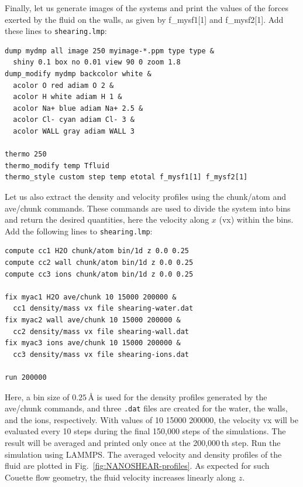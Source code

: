 \documentclass[9pt,tutorial]{livecoms}
\newcommand{\lmpcmd}[1]{\hspace{0pt}\colorbox{listing}{\textcolor{command}{\small{#1}}}\hspace{0pt}} %
\newcommand{\flecmd}[1]{\textcolor{command}{\texttt{#1}}} %
\begin{document}
Finally, let us generate images of the systems and print the values of the
forces exerted by the fluid on the walls, as given by \lmpcmd{f\_mysf1[1]}
and \lmpcmd{f\_mysf2[1]}.  Add these lines to \flecmd{shearing.lmp}:
\begin{lstlisting}
dump mydmp all image 250 myimage-*.ppm type type &
  shiny 0.1 box no 0.01 view 90 0 zoom 1.8
dump_modify mydmp backcolor white &
  acolor O red adiam O 2 &
  acolor H white adiam H 1 &
  acolor Na+ blue adiam Na+ 2.5 &
  acolor Cl- cyan adiam Cl- 3 &
  acolor WALL gray adiam WALL 3

thermo 250
thermo_modify temp Tfluid
thermo_style custom step temp etotal f_mysf1[1] f_mysf2[1] 
\end{lstlisting}
Let us also extract the density and velocity profiles using
the \lmpcmd{chunk/atom} and \lmpcmd{ave/chunk} commands.  These commands are
used to divide the system into bins and return the desired quantities, here the velocity
along $x$ (\lmpcmd{vx}) within the bins.  Add the following lines to \flecmd{shearing.lmp}:
\begin{lstlisting}
compute cc1 H2O chunk/atom bin/1d z 0.0 0.25
compute cc2 wall chunk/atom bin/1d z 0.0 0.25
compute cc3 ions chunk/atom bin/1d z 0.0 0.25

fix myac1 H2O ave/chunk 10 15000 200000 &
  cc1 density/mass vx file shearing-water.dat
fix myac2 wall ave/chunk 10 15000 200000 &
  cc2 density/mass vx file shearing-wall.dat
fix myac3 ions ave/chunk 10 15000 200000 &
  cc3 density/mass vx file shearing-ions.dat

run 200000
\end{lstlisting}
Here, a bin size of $0.25\,\text{\AA{}}$ is used for the density profiles generated
by the \lmpcmd{ave/chunk} commands, and three \flecmd{.dat} files are created for
the water, the walls, and the ions, respectively.  With values of \lmpcmd{10 15000 200000},
the velocity \lmpcmd{vx} will be evaluated every 10 steps during the final 150,000
steps of the simulations.  The result will be averaged and printed only once at the 200,000\,th step.
Run the simulation using LAMMPS.  The averaged velocity and density
profiles of the fluid are plotted in Fig.~\ref{fig:NANOSHEAR-profiles}.
As expected for such Couette flow geometry, the fluid velocity increases linearly along $z$.
\end{document}

